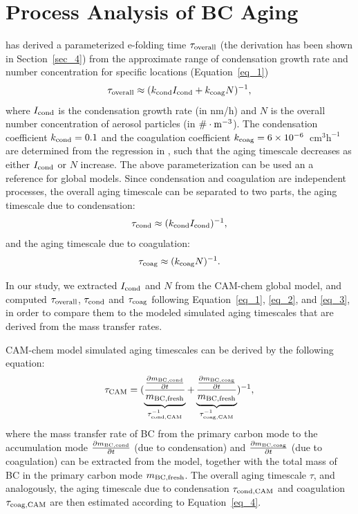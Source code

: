 \documentclass[12pt, fullpage]{uiucthesis2009}
\begin{document}
	\section{Process Analysis of BC Aging}
	\citet{Fierce2016} has derived a parameterized e-folding time $\tau_{\rm overall}$ (the derivation has been shown in Section~\ref{sec_4}) from the approximate range of condensation growth rate and number concentration for specific locations (Equation~\ref{eq_1}) 
	\begin{align}{\label{eq_1}}
	\tau_{\rm overall} \approx (k_{\rm cond}I_{\rm cond} + k_{\rm coag}N)^{-1},
	\end{align} 
	where $I_{\rm cond}$ is the condensation growth rate (in nm/h) and $N$ is the overall number concentration of aerosol particles (in $ \# \cdot \rm m^{-3}$). The condensation coefficient $k_{\rm cond} = 0.1$ and the coagulation coefficient $k_{\rm coag} = 6\times 10^{-6}$~$\text{cm}^3\text{h}^{-1}$ are determined from the regression in \citet{Fierce2016}, such that the aging timescale decreases as either $I_{\rm cond}$ or $N$ increase. The above parameterization can be used an a reference for global models. Since condensation and coagulation are independent processes, the overall aging timescale can be separated to two parts, the aging timescale due to condensation:
	\begin{align}{\label{eq_2}}
	\tau_{\rm cond} \approx (k_{\rm cond}I_{\rm cond})^{-1},
	\end{align} 
	and the aging timescale due to coagulation:
	\begin{align}{\label{eq_3}}
	\tau_{\rm coag} \approx (k_{\rm coag}N)^{-1}.
	\end{align}  
	
    In our study, we extracted $I_{\rm cond}$ and $N$ from the CAM-chem global model, and computed $\tau_{\rm overall}$, $\tau_{\rm cond}$ and $\tau_{\rm coag}$ following Equation~\ref{eq_1}, \ref{eq_2}, and \ref{eq_3}, in order to compare them to the modeled simulated aging timescales that are derived from the mass transfer rates.
	
	CAM-chem model simulated aging timescales can be derived by the following equation:
	\begin{align}{\label{eq_4}}
	\tau_{\rm CAM} = (\underbrace{\frac{\frac{\partial m_{\rm BC, cond}}{\partial t}}{m_{\rm BC, fresh}}}_{\tau_{\rm cond, CAM}^{-1}} + \underbrace{\frac{\frac{\partial m_{\rm BC, coag}}{\partial t}}{m_{\rm BC, fresh}}}_{\tau_{\rm coag, CAM}^{-1}})^{-1},
	\end{align} 
	where the mass transfer rate of BC from the primary carbon mode to the accumulation mode $\frac{\partial m_{\rm BC, cond}}{\partial t}$ (due to condensation) and $\frac{\partial m_{\rm BC, coag}}{\partial t}$ (due to coagulation) can be extracted from the model, together with the total mass of BC in the primary carbon mode $m_{\rm BC, fresh}$. The overall aging timescale $\tau$, and analogously, the aging timescale due to condensation $\tau_{\rm cond, CAM}$ and coagulation $\tau_{\rm coag, CAM}$ are then estimated according to Equation~\ref{eq_4}.
	
\end{document}

